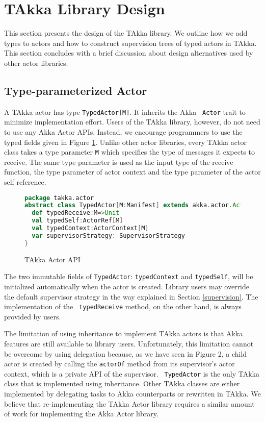 \section{TAkka Library Design}

This section presents the design of the TAkka library.  We outline how
we add types to actors and how to construct supervision trees of typed actors in
TAkka.  This section concludes with a brief discussion about design alternatives
used by other actor libraries.

\subsection{Type-parameterized Actor}
\label{actor}
A TAkka actor has type {\tt TypedActor[M]}.  It inherits the Akka {\tt
Actor} trait to minimize implementation effort.  Users of the TAkka library,
however, do not need to use any Akka Actor APIs.  Instead, we encourage
programmers to use the typed fields given in Figure \ref{takka_actor_api}. 
 Unlike other actor libraries, every TAkka actor class takes a type parameter 
{\tt M} which specifies the type of messages it expects to receive.  The same 
type parameter is used as the input type of the receive function, the type 
parameter of actor context and the type parameter of the actor self reference.

\begin{figure}[H]
\label{takka_actor_api}
\begin{lstlisting}[language=scala]
package takka.actor
abstract class TypedActor[M:Manifest] extends akka.actor.Actor {
  def typedReceive:M=>Unit
  val typedSelf:ActorRef[M]
  val typedContext:ActorContext[M]
  var supervisorStrategy: SupervisorStrategy
}
\end{lstlisting}
\caption{TAkka Actor API}
\end{figure}

The two immutable fields of {\tt TypedActor}: {\tt typedContext} and 
{\tt typedSelf}, will be initialized automatically when the actor is created.
Library users may override the default supervisor strategy in the
way explained in Section \ref{supervision}.  The implementation of the {\tt
typedReceive} method, on the other hand, is always provided by users.

The limitation of using inheritance to implement TAkka actors is that Akka 
features are still available to library users.  Unfortunately, this limitation 
cannot be overcome by using delegation because, as we have seen in Figure 2, 
a child actor is created by calling the {\tt actorOf} method from its 
supervisor's actor context, which is a private API of the supervisor.  {\tt 
TypedActor} is the only TAkka class that is implemented using inheritance. 
Other TAkka classes are either implemented by delegating tasks to Akka 
counterparts or rewritten in TAkka.  We believe that re-implementing the TAkka 
Actor library requires a similar amount of work for implementing the Akka Actor 
library.


